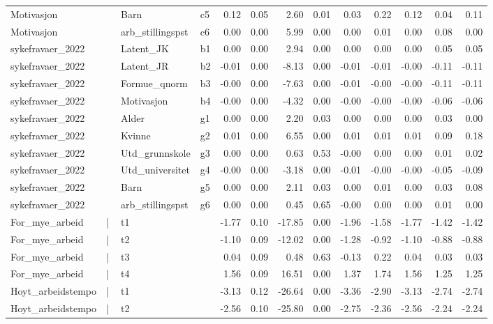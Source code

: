 \documentclass[
  12pt,
  a4paper,
  DIV=11,
  numbers=noendperiod]{scrartcl}
\begin{document}
\begin{table}[ht]
\begin{tabular}{llllrrrrrrrrr}
  Motivasjon & ~ & Barn & c5 & 0.12 & 0.05 & 2.60 & 0.01 & 0.03 & 0.22 & 0.12 & 0.04 & 0.11 \\ 
  Motivasjon & ~ & arb\_stillingspst & c6 & 0.00 & 0.00 & 5.99 & 0.00 & 0.00 & 0.01 & 0.00 & 0.08 & 0.00 \\ 
  sykefravaer\_2022 & ~ & Latent\_JK & b1 & 0.00 & 0.00 & 2.94 & 0.00 & 0.00 & 0.00 & 0.00 & 0.05 & 0.05 \\ 
  sykefravaer\_2022 & ~ & Latent\_JR & b2 & -0.01 & 0.00 & -8.13 & 0.00 & -0.01 & -0.01 & -0.00 & -0.11 & -0.11 \\ 
  sykefravaer\_2022 & ~ & Formue\_qnorm & b3 & -0.00 & 0.00 & -7.63 & 0.00 & -0.01 & -0.00 & -0.00 & -0.11 & -0.11 \\ 
  sykefravaer\_2022 & ~ & Motivasjon & b4 & -0.00 & 0.00 & -4.32 & 0.00 & -0.00 & -0.00 & -0.00 & -0.06 & -0.06 \\ 
  sykefravaer\_2022 & ~ & Alder & g1 & 0.00 & 0.00 & 2.20 & 0.03 & 0.00 & 0.00 & 0.00 & 0.03 & 0.00 \\ 
  sykefravaer\_2022 & ~ & Kvinne & g2 & 0.01 & 0.00 & 6.55 & 0.00 & 0.01 & 0.01 & 0.01 & 0.09 & 0.18 \\ 
  sykefravaer\_2022 & ~ & Utd\_grunnskole & g3 & 0.00 & 0.00 & 0.63 & 0.53 & -0.00 & 0.00 & 0.00 & 0.01 & 0.02 \\ 
  sykefravaer\_2022 & ~ & Utd\_universitet & g4 & -0.00 & 0.00 & -3.18 & 0.00 & -0.01 & -0.00 & -0.00 & -0.05 & -0.09 \\ 
  sykefravaer\_2022 & ~ & Barn & g5 & 0.00 & 0.00 & 2.11 & 0.03 & 0.00 & 0.01 & 0.00 & 0.03 & 0.08 \\ 
  sykefravaer\_2022 & ~ & arb\_stillingspst & g6 & 0.00 & 0.00 & 0.45 & 0.65 & -0.00 & 0.00 & 0.00 & 0.01 & 0.00 \\ 
  For\_mye\_arbeid & | & t1 &  & -1.77 & 0.10 & -17.85 & 0.00 & -1.96 & -1.58 & -1.77 & -1.42 & -1.42 \\ 
  For\_mye\_arbeid & | & t2 &  & -1.10 & 0.09 & -12.02 & 0.00 & -1.28 & -0.92 & -1.10 & -0.88 & -0.88 \\ 
  For\_mye\_arbeid & | & t3 &  & 0.04 & 0.09 & 0.48 & 0.63 & -0.13 & 0.22 & 0.04 & 0.03 & 0.03 \\ 
  For\_mye\_arbeid & | & t4 &  & 1.56 & 0.09 & 16.51 & 0.00 & 1.37 & 1.74 & 1.56 & 1.25 & 1.25 \\ 
  Hoyt\_arbeidstempo & | & t1 &  & -3.13 & 0.12 & -26.64 & 0.00 & -3.36 & -2.90 & -3.13 & -2.74 & -2.74 \\ 
  Hoyt\_arbeidstempo & | & t2 &  & -2.56 & 0.10 & -25.80 & 0.00 & -2.75 & -2.36 & -2.56 & -2.24 & -2.24 \\ 

\end{tabular}
\end{table}
\end{document}
